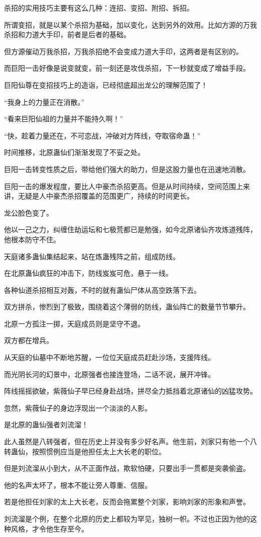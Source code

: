 \begin{this_body}
杀招的实用技巧主要有这么几种：连招、变招、附招、拆招。

所谓变招，就是以某个杀招为基础，加以变化，达到另外的效用。比如方源的万我杀招和力道大手印，前者是后者的基础。

但方源催动万我杀招，万我杀招绝不会变成力道大手印，这两者是有区别的。

而巨阳一击好像是说变就变，前一刻还是攻伐杀招，下一秒就变成了增益手段。

巨阳仙尊在变招技巧上的造诣，已经彻底超出龙公的理解范围了！

“我身上的力量正在消散。”

“看来巨阳仙祖的力量并不能持久啊！”

“快，趁着力量还在，不可恋战，冲破对方阵线，夺取宿命蛊！”

时间推移，北原蛊仙们渐渐发现了不妥之处。

巨阳一击转变性质之后，带给他们强大的助力，但是这股力量也在迅速地消散。

巨阳一击的爆发程度，要比人中豪杰杀招更高。但是从时间持续，空间范围上来讲，无疑是人中豪杰杀招覆盖的范围更广，持续的时间更长。

龙公脸色变了。

他以一己之力，纠缠住劫运坛和七极荒都已是勉强，如今北原诸仙齐攻炼道残阵，他根本防守不住。

天庭诸多蛊仙集结起来，站在炼蛊残阵之前，组成防线。

在北原蛊仙疯狂的冲击下，防线岌岌可危，悬于一线。

各种仙道杀招相互对轰，不时的就有蛊仙尸体从高空跌落下去。

双方拼杀，惨烈到了极致，围绕着这个薄弱的防线，蛊仙阵亡的数量节节攀升。

北原一方孤注一掷，天庭成员则是坚守不退。

双方都在增兵。

从天庭的仙墓中不断地苏醒，一位位天庭成员赶赴沙场，支援阵线。

而光阴长河的幻景中，北原强者也接连登场，二话不说，展开冲锋。

阵线摇摇欲破，紫薇仙子早已经身赴战场，拼尽全力抵挡着北原诸仙的凶猛攻势。

忽然，紫薇仙子的身边浮现出一个淡淡的人影。

是北原的蛊仙强者刘流溜！

此人虽然是八转强者，但在历史上并没有多少好名声。他生前，刘家只有他一个八转蛊仙，按照惯例应当是他担任太上大长老的职位。

但是刘流溜从小到大，从不正面作战，欺软怕硬，只要出手一贯都是突袭偷盗。

他的名声太坏了，根本不能让旁人尊重、信服。

若是他担任刘家的太上大长老，反而会拖累整个刘家，影响刘家的形象和声誉。

刘流溜是个例，在整个北原的历史上都较为罕见，独树一帜。不过也正因为他的这种风格，才令他生存至今。

\end{this_body}

